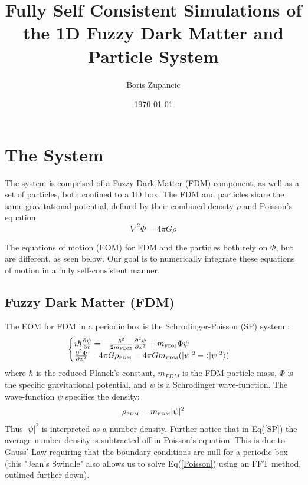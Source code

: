 \documentclass[oneside]{book}
\title{Fully Self Consistent Simulations of the 1D Fuzzy Dark Matter and Particle System}
\author{Boris Zupancic}
\date{\today}
\newcommand{\pd}{\partial}
\begin{document}
\maketitle

\tableofcontents

\chapter{The System}

The system is comprised of a Fuzzy Dark Matter (FDM) component, as well as a set of particles, both confined to a 1D box. The FDM and particles share the same gravitational potential, defined by their combined density $\rho$ and Poisson's equation: 
\begin{equation}
\nabla^2 \Phi = 4\pi G \rho    
\label{Poisson}
\end{equation}

The equations of motion (EOM) for FDM and the particles both rely on $\Phi$, but are different, as seen below. Our goal is to numerically integrate these equations of motion in a fully self-consistent manner.

\section{Fuzzy Dark Matter (FDM)}
The EOM for FDM in a periodic box is the Schrodinger-Poisson (SP) system :
\begin{equation}
    \begin{cases}
    i\hbar \frac{\pd \psi}{\pd t} = -\frac{\hbar^2}{2 m_\text{\tiny{FDM}}} \frac{\pd^2 \psi}{\pd x^2} + m_\text{\tiny{FDM}} \Phi \psi 
    \\
    \frac{\pd^2 \Phi}{\pd x^2} = 4\pi G \rho_\text{\tiny{FDM}}= 4\pi G m_\text{\tiny{FDM}} (|\psi|^2 - \langle |\psi|^2 \rangle)
    \end{cases}
    \label{SP}
\end{equation}
where $\hbar$ is the reduced Planck's constant, $m_{FDM}$ is the FDM-particle mass, $\Phi$ is the specific gravitational potential, and $\psi$ is a Schrodinger wave-function. The wave-function $\psi$ specifies the density:
$$\rho_\text{\tiny{FDM}} = m_\text{\tiny{FDM}}|\psi|^2$$
Thus $|\psi|^2$ is interpreted as a number density. Further notice that in Eq(\ref{SP}) the average number density is subtracted off in Poisson's equation. This is due to Gauss' Law requiring that the boundary conditions are null for a periodic box (this "Jean's Swindle" also allows us to solve Eq(\ref{Poisson}) using an FFT method, outlined further down). 
\end{document}
